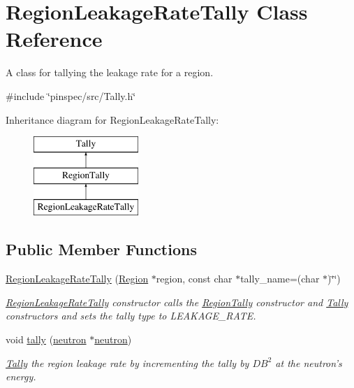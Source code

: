 \hypertarget{classRegionLeakageRateTally}{\section{Region\-Leakage\-Rate\-Tally Class Reference}
\label{classRegionLeakageRateTally}
}


A class for tallying the leakage rate for a region.  




{\ttfamily \#include \char`\"{}pinspec/src/\-Tally.\-h\char`\"{}}

Inheritance diagram for Region\-Leakage\-Rate\-Tally\-:\begin{figure}[H]
\begin{center}
\leavevmode
\includegraphics[height=3.000000cm]{classRegionLeakageRateTally}
\end{center}
\end{figure}
\subsection*{Public Member Functions}
\begin{DoxyCompactItemize}
\item 
\hyperlink{classRegionLeakageRateTally_a273616ced1ebb70364c29da24669793c}{Region\-Leakage\-Rate\-Tally} (\hyperlink{classRegion}{Region} $\ast$region, const char $\ast$tally\-\_\-name=(char $\ast$)\char`\"{}\char`\"{})
\begin{DoxyCompactList}\small\item\em \hyperlink{classRegionLeakageRateTally}{Region\-Leakage\-Rate\-Tally} constructor calls the \hyperlink{classRegionTally}{Region\-Tally} constructor and \hyperlink{classTally}{Tally} constructors and sets the tally type to L\-E\-A\-K\-A\-G\-E\-\_\-\-R\-A\-T\-E. \end{DoxyCompactList}\item 
void \hyperlink{classRegionLeakageRateTally_a9f8749a387783d68de8fc8ecaf347748}{tally} (\hyperlink{structneutron}{neutron} $\ast$\hyperlink{structneutron}{neutron})
\begin{DoxyCompactList}\small\item\em \hyperlink{classTally}{Tally} the region leakage rate by incrementing the tally by $ DB^2 $ at the neutron's energy. \end{DoxyCompactList}\end{DoxyCompactItemize}
